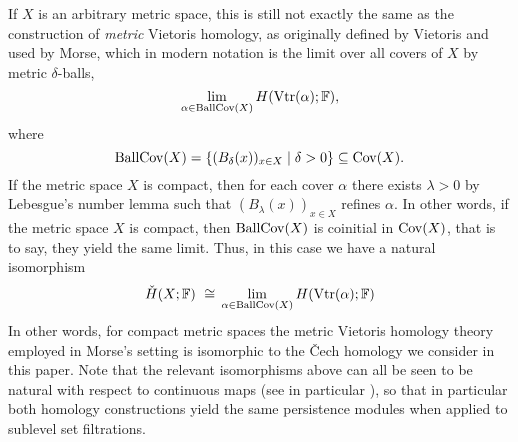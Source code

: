 If $X$ is an arbitrary metric space, this is still not exactly the same as the construction of \emph{metric} Vietoris homology, as originally defined by Vietoris \cite{Vietoris.1927} and used by Morse, which in modern notation is the limit over all covers of $X$ by metric $\delta$-balls,
\begin{equation*}
\lim_{\alpha \in \operatorname{BallCov}(X)} H (\operatorname{Vtr} (\alpha); \mathbb{F}),
\end{equation*}
where
\begin{equation*}
\operatorname{BallCov} (X) = \left\{ ( B_{\delta} (x) )_{x \in X} \mid \delta > 0 \right\}
\subseteq \operatorname{Cov} (X).
\end{equation*}
If the metric space $X$ is compact, then for each cover $\alpha$ there exists $\lambda > 0$ by Lebesgue's number lemma \cite[Lemma 27.5]{Munkres.2000} such that $(B_{\lambda}(x))_{x \in X}$ refines $\alpha$.
In other words, if the metric space $X$ is compact, then $\operatorname{BallCov} (X)$ is coinitial in $\operatorname{Cov} (X)$, that is to say, they yield the same limit.
Thus, in this case we have a natural isomorphism
\begin{equation*}
\check{H} (X; \mathbb{F}) \ \cong \,
\lim_{\alpha \in \operatorname{BallCov}(X)} H (\operatorname{Vtr} (\alpha); \mathbb{F})
\end{equation*}
In other words, for compact metric spaces the metric Vietoris homology theory employed in Morse's setting is isomorphic to the \v{C}ech homology we consider in this paper.
Note that the relevant isomorphisms above can all be seen to be natural with respect to continuous maps (see in particular \cite[Lemma 7a]{Dowker.1952}), so that in particular both homology constructions yield the same persistence modules when applied to sublevel set filtrations.
